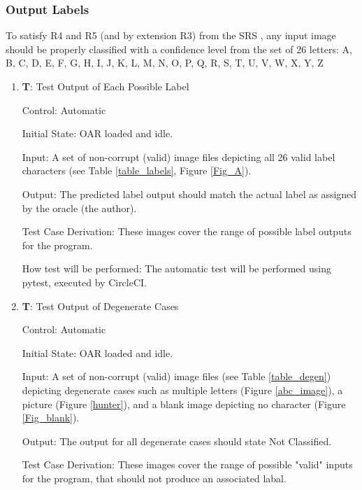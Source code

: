 \documentclass[12pt, titlepage]{article}
\newcounter{testnum} %
\begin{document}
\subsubsection{Output Labels}

To satisfy R4 and R5 (and by extension R3) from the SRS \citep{SRS}, any input image should be properly classified with a confidence level from the set of 26 letters: {A, B, C, D, E, F, G, H, I, J, K, L, M, N, O, P, Q, R, S, T, U, V, W, X, Y, Z}

\begin{enumerate}

  \item{\textbf{T\thetestnum \label{T_outputLabel}}: Test Output of Each Possible Label\\}
            
  Control: Automatic
            
  Initial State: OAR loaded and idle.
            
  Input: A set of non-corrupt (valid) image files depicting all 26 valid label characters (see Table \ref{table_labels}, Figure \ref{Fig_A}).
            
  Output: The predicted label output should match the actual label as assigned by the oracle (the author).

  Test Case Derivation: These images cover the range of possible label outputs for the program.
            
  How test will be performed: The automatic test will be performed using pytest, executed by CircleCI.

  \item{\textbf{T\thetestnum \label{T_outputDegen}}: Test Output of Degenerate Cases\\}
            
  Control: Automatic
            
  Initial State: OAR loaded and idle.
            
  Input: A set of non-corrupt (valid) image files (see Table \ref{table_degen}) depicting degenerate cases such as multiple letters (Figure \ref{abc_image}), a picture (Figure \ref{hunter}), and a blank image depicting no character (Figure \ref{Fig_blank}).
            
  Output: The output for all degenerate cases should state Not Classified.
            
  Test Case Derivation: These images cover the range of possible "valid" inputs for the program, that should not produce an associated labal.
            

\end{enumerate}
\end{document}
